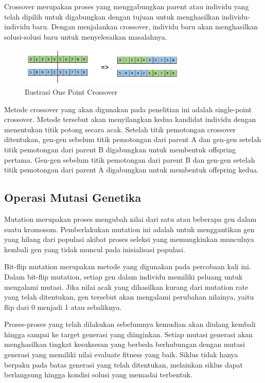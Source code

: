\documentclass[conference]{IEEEtran}
\begin{document}
Crossover merupakan proses yang menggabungkan parent atau individu yang telah dipilih untuk digabungkan dengan tujuan untuk menghasilkan individu-individu baru. Dengan menjalankan crossover, individu baru akan menghasilkan solusi-solusi baru untuk menyelesaikan masalahnya. 

\begin{figure}[htp]
    \centering
    \includegraphics[width=8cm]{images/one_point_crossover.jpg}
    \caption{Ilustrasi One Point Crossover}
    \label{fig:crossover}
\end{figure}

Metode crossover yang akan digunakan pada penelitian ini adalah single-point crossover. Metode tersebut akan menyilangkan kedua kandidat individu dengan menentukan titik potong secara acak. \cite{Ertel2011} Setelah titik pemotongan crossover ditentukan, gen-gen sebelum titik pemotongan dari parent A dan gen-gen setelah titik pemotongan dari parent B digabungkan untuk membentuk offspring pertama. Gen-gen sebelum titik pemotongan dari parent B dan gen-gen setelah titik pemotongan dari parent A digabungkan untuk membentuk offspring kedua.

\subsection{Operasi Mutasi Genetika}

Mutation merupakan proses mengubah nilai dari satu atau beberapa gen dalam suatu kromosom. Pemberlakukan mutation ini adalah untuk menggantikan gen yang hilang dari populasi akibat proses seleksi yang memungkinkan munculnya kembali gen yang tidak muncul pada inisialisasi populasi.

Bit-flip mutation merupakan metode yang digunakan pada percobaan kali ini. Dalam bit-flip mutation, setiap gen dalam individu memiliki peluang untuk mengalami mutasi. Jika nilai acak yang dihasilkan kurang dari mutation rate yang telah ditentukan, gen tersebut akan mengalami perubahan nilainya, yaitu flip dari 0 menjadi 1 atau sebaliknya.

Proses-proses yang telah dilakukan sebelumnya kemudian akan diulang kembali hingga sampai ke target generasi yang diinginkan. Setiap mutasi generasi akan menghasilkan tingkat kesuksesan yang berbeda berhubungan dengan mutasi generasi yang memiliki nilai evaluate fitness yang baik. Siklus tidak hanya berpaku pada batas generasi yang telah ditentukan, melainkan siklus dapat berlangsung hingga kondisi solusi yang memadai terbentuk.
\end{document}
